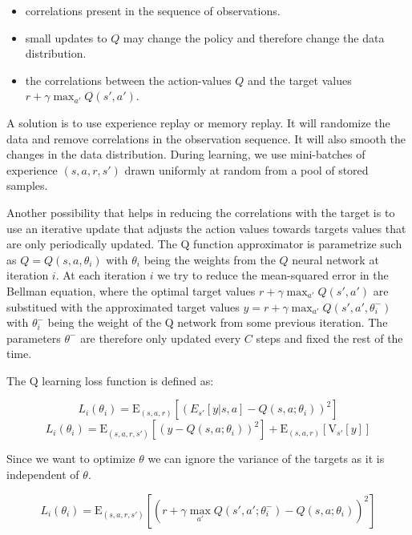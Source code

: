 \documentclass[12pt]{article}
\begin{document}
\begin{itemize}
\item correlations present in the sequence of observations.
\item small updates to $Q$ may change the policy and therefore change the data distribution.
\item the correlations between the action-values $Q$ and the target values $r + \gamma \max_{a'} Q(s',a')$.
\end{itemize}

A solution is to use experience replay or memory replay. 
It will randomize the data and remove correlations in the observation sequence. 
It will also smooth the changes in the data distribution. 
During learning, we use mini-batches of experience $(s,a,r,s')$ drawn uniformly at random from a pool of stored samples.

Another possibility that helps in reducing the correlations with the target is to use an iterative update that adjusts the action values towards targets values that are only periodically updated.
The Q function approximator is parametrize such as $Q=Q(s,a,\theta_{i})$ with $\theta_i$ being the weights from the $Q$ neural network at iteration $i$.
At each iteration $i$ we try to reduce the mean-squared error in the Bellman equation, where the optimal target values $r+\gamma  \max_{a'} Q(s',a')$ are substitued with the approximated target values $y=r+\gamma  \max_{a'} Q(s',a',\theta_i^-)$ with $\theta_i^-$ being the weight of the Q network from some previous iteration.
The parameters $\theta^-$ are therefore only updated every $C$ steps and fixed the rest of the time.

The Q learning loss function is defined as:

\begin{equation} 
 	L_{i}(\theta_{i}) =\mathrm{E}_{(s,a,r)}[( E_{s'}[y|s,a]-Q(s,a;\theta_i))^2]
\end{equation}
\begin{equation} 
	L_{i}(\theta_{i}) =\mathrm{E}_{(s,a,r,s')}[(y-Q(s,a;\theta_i))^2]+\mathrm{E}_{(s,a,r)} [\mathrm{V}_{s'}[y]]
\end{equation} 

Since we want to optimize $\theta$ we can ignore the variance of the targets as it is independent of $\theta$.

\begin{equation}  
L_{i}(\theta_{i}) =\mathrm{E}_{(s,a,r,s')}[(r+\gamma  \max_{a'} Q(s',a'; \theta_{i}^- )-Q(s,a;\theta_{i}))^2]
\end{equation} 
\end{document}
